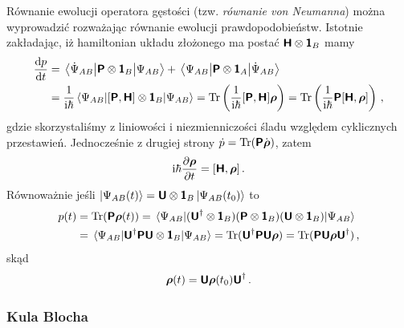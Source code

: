 \documentclass{myclass}
\begin{document}
Równanie ewolucji operatora gęstości (tzw. \textit{równanie von Neumanna}) można wyprowadzić
rozważając równanie ewolucji prawdopodobieństw. Istotnie zakładając, iż hamiltonian układu złożonego
ma postać \(\boldsymbol{\mathsf{H}}\otimes\boldsymbol{\mathsf{1}}_B\) mamy
\begin{equation*}
    \begin{split}
        \dv{p}{t} &= \mel{\dot{\Psi}_{AB}}{\oper{P}\otimes\oper{1}_B}{\Psi_{AB}} + \mel{\Psi_{AB}}{\oper{P}\otimes\oper{1}_A}{\dot{\Psi}_{AB}} \\
        & = \frac{1}{\im\hbar} \mel{\Psi_{AB}}{[\oper{P}, \oper{H}]\otimes\oper{1}_B}{\Psi_{AB}} = \Trace\left(\frac{1}{\im\hbar}[\oper{P}, \oper{H}]\oper{\rho}\right) = \Trace\left(\frac{1}{\im\hbar}\oper{P}[\oper{H}, \oper{\rho}]\right)\,,
    \end{split}
\end{equation*}
gdzie skorzystaliśmy z liniowości i niezmienniczości śladu względem cyklicznych przestawień.
Jednocześnie z drugiej strony \(\dot{p} = \Trace(\oper{P}\dot{\oper{\rho}})\), zatem
\begin{equation*}
    \mathrm{i}\hbar\pdv{\boldsymbol{\mathsf{\rho}}}{t} = [\boldsymbol{\mathsf{H}}, \boldsymbol{\mathsf{\rho}}]\,.
\end{equation*}
Równoważnie jeśli \(\ket{\Psi_{AB}(t)} = \boldsymbol{\mathsf{U}}\otimes\boldsymbol{\mathsf{1}}_B\ket{\Psi_{AB}(t_0)}\) to
\begin{equation*}
    \begin{split}
        p(t) &= \Trace(\oper{P}\oper{\rho}(t)) = \mel{\Psi_{AB}}{(\oper{U}^\dagger\otimes\oper{1}_B)(\oper{P}\otimes\oper{1}_B)(\oper{U}\otimes\oper{1}_B)}{\Psi_{AB}} \\
        &= \mel{\Psi_{AB}}{\oper{U}^\dagger\oper{PU}\otimes\oper{1}_B}{\Psi_{AB}} =\Trace(\oper{U}^\dagger\oper{P}\oper{U}\oper{\rho})= \Trace(\oper{P}\oper{U}\oper{\rho}\oper{U}^\dagger)\,,
    \end{split}
\end{equation*}
skąd
\begin{equation*}
    \boldsymbol{\mathsf{\rho}}(t) = \boldsymbol{\mathsf{U}}\boldsymbol{\mathsf{\rho}}(t_0)\boldsymbol{\mathsf{U}}^\dagger\,.
\end{equation*}

\subsubsection{Kula Blocha}
\end{document}
